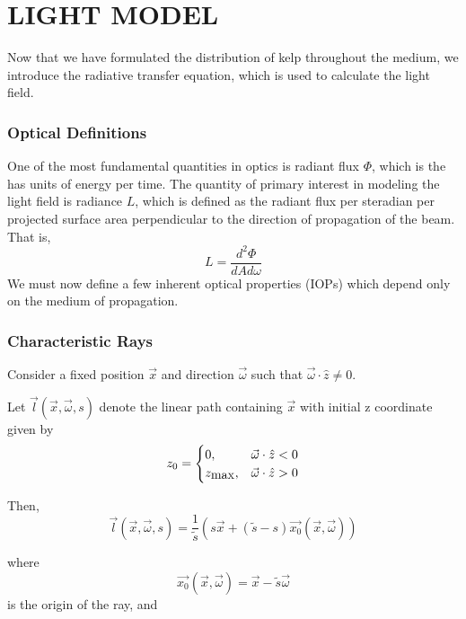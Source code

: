 \chapter{LIGHT MODEL}
\label{chap:light}

Now that we have formulated the distribution of kelp throughout the medium, we introduce the radiative transfer equation, which is used to calculate the light field.

\subsection{Optical Definitions}
One of the most fundamental quantities in optics is radiant flux $\Phi$, which is the has units of energy per time.
The quantity of primary interest in modeling the light field is radiance $L$, which is defined as the radiant flux per steradian per projected surface area perpendicular to the direction of propagation of the beam.
That is,
\begin{equation}
	L = \frac{d^2\Phi}{dA d\omega}
\end{equation}
We must now define a few inherent optical properties (IOPs) which depend only on the medium of propagation.

\subsection{Characteristic Rays}
Consider a fixed position $\vec{x}$ and direction $\vec{\omega}$ such that
$\vec{\omega} \cdot \hat{z} \neq 0$.


Let $\vec{l}(\vec{x}, \vec{\omega}, s)$ denote the linear path containing $\vec{x}$
with initial z coordinate given by
\begin{equation}
  z_0 =
   \begin{cases}
    0, & \vec{\omega} \cdot \hat{z} < 0 \\
    z_{\mbox{max}}, & \vec{\omega} \cdot \hat{z} > 0
  \end{cases}
\end{equation}

Then,
\begin{equation}
  \vec{l}(\vec{x}, \vec{\omega}, s) = \frac{1}{\tilde{s}} (s\vec{x} + (\tilde{s} - s)\vec{x_0}(\vec{x}, \vec{\omega}))
\end{equation}

where
\begin{equation}
  \vec{x_0}(\vec{x}, \vec{\omega}) = \vec{x} - \tilde{s} \vec{\omega}
\end{equation}
is the origin of the ray, and 


